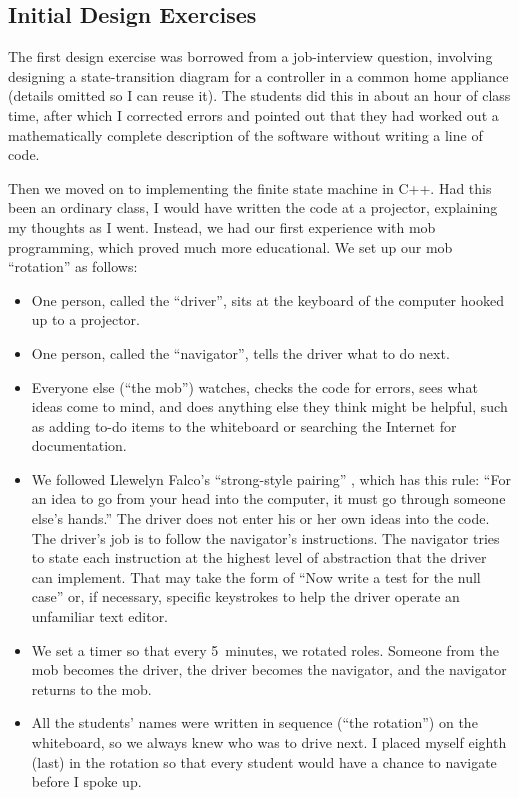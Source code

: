 \documentclass{article}
\begin{document}
\subsection{Initial Design Exercises}

The first design exercise was borrowed from a job-interview question,
involving designing a state-transition diagram for a controller in a common
home appliance (details omitted so I can reuse it). The students did this in
about an hour of class time, after which I corrected errors and pointed out
that they had worked out a mathematically complete description of the software
without writing a line of code.

Then we moved on to implementing the finite state machine in C++. Had this
been an ordinary class, I would have written the code at a projector,
explaining my thoughts as I went. Instead, we had our first experience with
mob programming, which proved much more educational. We set up our mob
``rotation'' as follows:

\begin{itemize}
\item One person, called the ``driver'', sits at the keyboard of the computer
hooked up to a projector.

\item One person, called the ``navigator'', tells the driver what to do next.

\item Everyone else (``the mob'') watches, checks the code for errors, sees
what ideas come to mind, and does anything else they think might be helpful,
such as adding to-do items to the whiteboard or searching the Internet for
documentation.

\item We followed Llewelyn Falco's ``strong-style
pairing'' \cite{falco2014strong}, which has this rule: ``For an idea to go from
your head into the computer, it must go through someone else's hands.'' The
driver does not enter his or her own ideas into the code. The driver's
job is to follow the navigator's instructions. The navigator tries to state
each instruction at the highest level of abstraction that the driver can
implement. That may take the form of ``Now write a test for the null case''
or, if necessary, specific keystrokes to help the driver operate an unfamiliar
text editor.


\item We set a timer so that every 5~minutes, we rotated roles. Someone from
the mob becomes the driver, the driver becomes the navigator, and the
navigator returns to the mob.

\item All the students' names were written in sequence (``the rotation'')
on the whiteboard, so we always knew who was to drive next. I placed myself
eighth (last) in the rotation so that every student would have a chance to
navigate before I spoke up.
\end{itemize}
\end{document}
